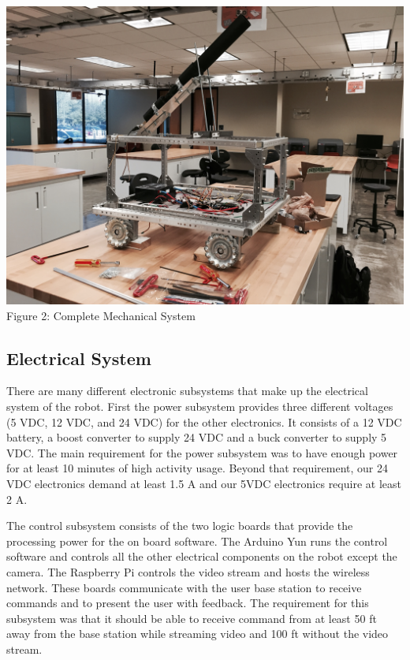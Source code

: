 \documentclass[letterpaper,12pt]{article}
\begin{document}
\begin{center}
    \includegraphics[width=15cm]{./pics/chassis/robot.jpg}
    Figure 2: Complete Mechanical System
\end{center}

\subsection{Electrical System}
There are many different electronic subsystems that make up the electrical
system of the robot. First the power subsystem provides three different
voltages (5 VDC,  12 VDC, and 24 VDC) for the other electronics. It consists of
a 12 VDC battery, a boost converter to supply 24 VDC and a buck converter to
supply 5 VDC. The main requirement for the power subsystem was to have enough
power for at least 10 minutes of high activity usage. Beyond that requirement,
our 24 VDC electronics demand at least 1.5 A and our 5VDC electronics require
at least 2 A.

The control subsystem consists of the two logic boards that provide the
processing power for the on board software. The Arduino Yun runs the control
software and controls all the other electrical components on the robot except
the camera. The Raspberry Pi controls the video stream and hosts the wireless
network. These boards communicate with the user base station to receive
commands and to present the user with feedback. The requirement for this
subsystem was that it should be able to receive command from at least 50 ft
away from the base station while streaming video and 100 ft without the video
stream.
\end{document}
